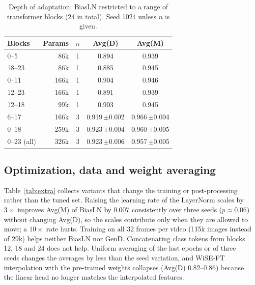 \documentclass[fonts]{icst}
\begin{document}
\begin{table}[!t]
\centering
\caption{Depth of adaptation: BiasLN restricted to a range of transformer blocks (24 in total). Seed 1024 unless $n$ is given.}
\label{tab:depth}
\footnotesize
\begin{tabular}{l r c c c}
\toprule
\textbf{Blocks} & \textbf{Params} & $n$ & \textbf{Avg(D)} & \textbf{Avg(M)} \\
\midrule
0--5 & 86k & 1 & 0.894 & 0.939 \\
18--23 & 86k & 1 & 0.885 & 0.945 \\
0--11 & 166k & 1 & 0.904 & 0.946 \\
12--23 & 166k & 1 & 0.891 & 0.939 \\
12--18 & 99k & 1 & 0.903 & 0.945 \\
6--17 & 166k & 3 & 0.919\,{\scriptsize$\pm$0.002} & 0.966\,{\scriptsize$\pm$0.004} \\
0--18 & 259k & 3 & 0.923\,{\scriptsize$\pm$0.004} & 0.960\,{\scriptsize$\pm$0.005} \\
0--23 (all) & 326k & 3 & 0.923\,{\scriptsize$\pm$0.006} & 0.957\,{\scriptsize$\pm$0.005} \\
\bottomrule
\end{tabular}
\end{table}

\subsection{Optimization, data and weight averaging}
Table~\ref{tab:extra} collects variants that change the training or post-processing rather than the tuned set. Raising the learning rate of the LayerNorm scales by $3\times$ improves Avg(M) of BiasLN by 0.007 consistently over three seeds ($p\approx0.06$) without changing Avg(D), so the scales contribute only when they are allowed to move; a $10\times$ rate hurts. Training on all 32 frames per video (115k images instead of 29k) helps neither BiasLN nor GenD. Concatenating class tokens from blocks 12, 18 and 24 does not help. Uniform averaging of the last epochs or of three seeds changes the averages by less than the seed variation, and WiSE-FT interpolation with the pre-trained weights collapses (Avg(D) 0.82--0.86) because the linear head no longer matches the interpolated features.
\end{document}
